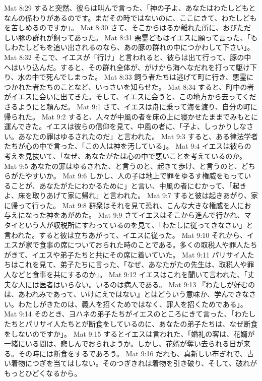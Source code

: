 Mat 8:29  すると突然、彼らは叫んで言った、「神の子よ、あなたはわたしどもとなんの係わりがあるのです。まだその時ではないのに、ここにきて、わたしどもを苦しめるのですか」。
Mat 8:30  さて、そこからはるか離れた所に、おびただしい豚の群れが飼ってあった。
Mat 8:31  悪霊どもはイエスに願って言った、「もしわたしどもを追い出されるのなら、あの豚の群れの中につかわして下さい」。
Mat 8:32  そこで、イエスが「行け」と言われると、彼らは出て行って、豚の中へはいり込んだ。すると、その群れ全体が、がけから海へなだれを打って駆け下り、水の中で死んでしまった。
Mat 8:33  飼う者たちは逃げて町に行き、悪霊につかれた者たちのことなど、いっさいを知らせた。
Mat 8:34  すると、町中の者がイエスに会いに出てきた。そして、イエスに会うと、この地方から去ってくださるようにと頼んだ。
Mat 9:1  さて、イエスは舟に乗って海を渡り、自分の町に帰られた。
Mat 9:2  すると、人々が中風の者を床の上に寝かせたままでみもとに運んできた。イエスは彼らの信仰を見て、中風の者に、「子よ、しっかりしなさい。あなたの罪はゆるされたのだ」と言われた。
Mat 9:3  すると、ある律法学者たちが心の中で言った、「この人は神を汚している」。
Mat 9:4  イエスは彼らの考えを見抜いて、「なぜ、あなたがたは心の中で悪いことを考えているのか。
Mat 9:5  あなたの罪はゆるされた、と言うのと、起きて歩け、と言うのと、どちらがたやすいか。
Mat 9:6  しかし、人の子は地上で罪をゆるす権威をもっていることが、あなたがたにわかるために」と言い、中風の者にむかって、「起きよ、床を取りあげて家に帰れ」と言われた。
Mat 9:7  すると彼は起きあがり、家に帰って行った。
Mat 9:8  群衆はそれを見て恐れ、こんな大きな権威を人にお与えになった神をあがめた。
Mat 9:9  さてイエスはそこから進んで行かれ、マタイという人が収税所にすわっているのを見て、「わたしに従ってきなさい」と言われた。すると彼は立ちあがって、イエスに従った。
Mat 9:10  それから、イエスが家で食事の席についておられた時のことである。多くの取税人や罪人たちがきて、イエスや弟子たちと共にその席に着いていた。
Mat 9:11  パリサイ人たちはこれを見て、弟子たちに言った、「なぜ、あなたがたの先生は、取税人や罪人などと食事を共にするのか」。
Mat 9:12  イエスはこれを聞いて言われた、「丈夫な人には医者はいらない。いるのは病人である。
Mat 9:13  『わたしが好むのは、あわれみであって、いけにえではない』とはどういう意味か、学んできなさい。わたしがきたのは、義人を招くためではなく、罪人を招くためである」。
Mat 9:14  そのとき、ヨハネの弟子たちがイエスのところにきて言った、「わたしたちとパリサイ人たちとが断食をしているのに、あなたの弟子たちは、なぜ断食をしないのですか」。
Mat 9:15  するとイエスは言われた、「婚礼の客は、花婿が一緒にいる間は、悲しんでおられようか。しかし、花婿が奪い去られる日が来る。その時には断食をするであろう。
Mat 9:16  だれも、真新しい布ぎれで、古い着物につぎを当てはしない。そのつぎきれは着物を引き破り、そして、破れがもっとひどくなるから。
